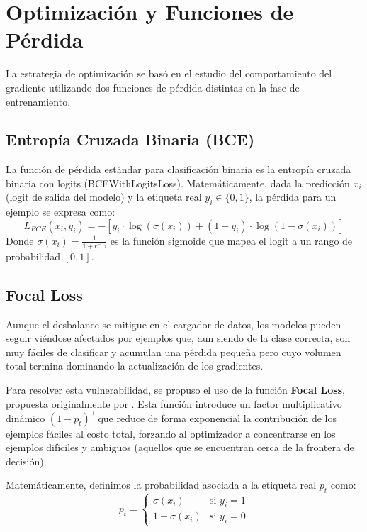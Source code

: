 \documentclass{article}
\begin{document}
\section{Optimización y Funciones de Pérdida}
La estrategia de optimización se basó en el estudio del comportamiento del gradiente utilizando dos funciones de pérdida distintas en la fase de entrenamiento.

\subsection{Entropía Cruzada Binaria (BCE)}
La función de pérdida estándar para clasificación binaria es la entropía cruzada binaria con logits (BCEWithLogitsLoss). Matemáticamente, dada la predicción $x_i$ (logit de salida del modelo) y la etiqueta real $y_i \in \{0, 1\}$, la pérdida para un ejemplo se expresa como:
\begin{equation}
L_{BCE}(x_i, y_i) = - [y_i \cdot \log(\sigma(x_i)) + (1 - y_i) \cdot \log(1 - \sigma(x_i))]
\end{equation}
Donde $\sigma(x_i) = \frac{1}{1 + e^{-x_i}}$ es la función sigmoide que mapea el logit a un rango de probabilidad $[0, 1]$.

\subsection{Focal Loss}
Aunque el desbalance se mitigue en el cargador de datos, los modelos pueden seguir viéndose afectados por ejemplos que, aun siendo de la clase correcta, son muy fáciles de clasificar y acumulan una pérdida pequeña pero cuyo volumen total termina dominando la actualización de los gradientes. 

Para resolver esta vulnerabilidad, se propuso el uso de la función \textbf{Focal Loss}, propuesta originalmente por \citet{lin2017focal}. Esta función introduce un factor multiplicativo dinámico $(1 - p_t)^\gamma$ que reduce de forma exponencial la contribución de los ejemplos fáciles al costo total, forzando al optimizador a concentrarse en los ejemplos difíciles y ambiguos (aquellos que se encuentran cerca de la frontera de decisión).

Matemáticamente, definimos la probabilidad asociada a la etiqueta real $p_t$ como:
\begin{equation}
p_t = \begin{cases} 
      \sigma(x_i) & \text{si } y_i = 1 \\
      1 - \sigma(x_i) & \text{si } y_i = 0 
   \end{cases}
\end{equation}
\end{document}
